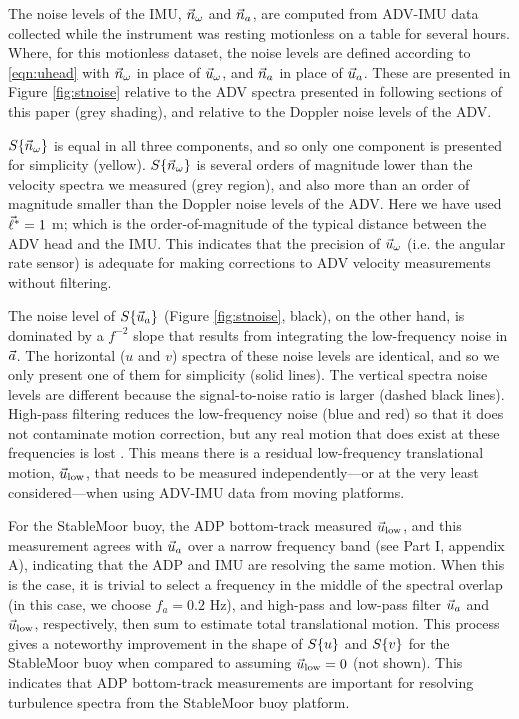 The noise levels of the IMU, $\vec{n}_{\omega}$ and $\vec{n}_{a}$, are computed from ADV-IMU data collected while the instrument was resting motionless on a table for several hours. Where, for this motionless dataset, the noise levels are defined according to \eqref{eqn:uhead} with $\vec{n}_{\omega}$ in place of $\vec{u}_\omega$, and $\vec{n}_{a}$ in place of $\vec{u}_a$.  These are presented in Figure \ref{fig:stnoise} relative to the ADV spectra presented in following sections of this paper (grey shading), and relative to the Doppler noise levels of the ADV.

$S\{\vec{n}_{\omega}\}$ is equal in all three components, and so only one component is presented for simplicity (yellow). $S\{\vec{n}_{\omega}\}$ is several orders of magnitude lower than the velocity spectra we measured (grey region), and also more than an order of magnitude smaller than the Doppler noise levels of the ADV. Here we have used $\vec{\ell}^*=1$ m; which is the order-of-magnitude of the typical distance between the ADV head and the IMU. This indicates that the precision of $\vec{u}_\omega$ (i.e. the angular rate sensor) is adequate for making corrections to ADV velocity measurements without filtering.

The noise level of $S\{\vec{u}_a\}$ (Figure \ref{fig:stnoise}, black), on the other hand, is dominated by a $f^{-2}$ slope that results from integrating the low-frequency noise in ${\vec{a}}$. The horizontal ($u$ and $v$) spectra of these noise levels are identical, and so we only present one of them for simplicity (solid lines). The vertical spectra noise levels are different because the signal-to-noise ratio is larger (dashed black lines). High-pass filtering reduces the low-frequency noise (blue and red) so that it does not contaminate motion correction, but any real motion that does exist at these frequencies is lost \cite[]{EgelandPhD2014, VanZwieten++2015}. This means there is a residual low-frequency translational motion, $\vec{u}_\mathrm{low}$, that needs to be measured independently---or at the very least considered---when using ADV-IMU data from moving platforms. 

For the StableMoor buoy, the ADP bottom-track measured $\vec{u}_\mathrm{low}$, and this measurement agrees with $\vec{u}_a$ over a narrow frequency band (see Part I, appendix A), indicating that the ADP and IMU are resolving the same motion. When this is the case, it is trivial to select a frequency in the middle of the spectral overlap (in this case, we choose $f_a=0.2$ Hz), and high-pass and low-pass filter $\vec{u}_a$ and $\vec{u}_\mathrm{low}$, respectively, then sum to estimate total translational motion. This process gives a noteworthy improvement in the shape of $S\{u\}$ and $S\{v\}$ for the StableMoor buoy when compared to assuming $\vec{u}_\mathrm{low}=0$ (not shown). This indicates that ADP bottom-track measurements are important for resolving turbulence spectra from the StableMoor buoy platform. 

